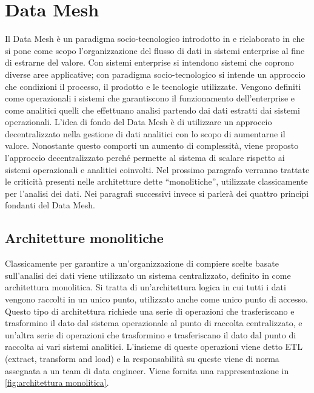 \documentclass[a4paper,12pt]{report}
\begin{document}
\section{Data Mesh}
Il Data Mesh è un paradigma socio-tecnologico introdotto in \cite{dehghani_data_2022} e rielaborato in \cite{zhamak_dehgani_how_2023,zhamak_dehgani_data_2023} che si pone come scopo l'organizzazione del flusso di dati in sistemi enterprise al fine di estrarne del valore.  
Con sistemi enterprise si intendono sistemi che coprono diverse aree applicative; con paradigma socio-tecnologico si intende un approccio che condizioni il processo, il prodotto e le tecnologie utilizzate. 
Vengono definiti come operazionali i sistemi che garantiscono il funzionamento dell'enterprise e come analitici quelli che effettuano analisi partendo dai dati estratti dai sistemi operazionali.
L'idea di fondo del Data Mesh è di utilizzare un approccio decentralizzato nella gestione di dati analitici con lo scopo di aumentarne il valore.
Nonostante questo comporti un aumento di complessità, viene proposto l'approccio decentralizzato perché permette al sistema di scalare rispetto ai sistemi operazionali e analitici coinvolti. 
Nel prossimo paragrafo verranno trattate le criticità presenti nelle architetture dette ``monolitiche'', utilizzate classicamente per l'analisi dei dati. 
Nei paragrafi successivi invece si parlerà dei quattro principi fondanti del Data Mesh.
\subsection{Architetture monolitiche}\label{architetture monolitiche}
Classicamente per garantire a un'organizzazione di compiere scelte basate sull'analisi dei dati viene utilizzato un sistema centralizzato, definito in \cite{zhamak_dehgani_how_2023} come architettura monolitica.
Si tratta di un'architettura logica in cui tutti i dati vengono raccolti in un unico punto, utilizzato anche come unico punto di accesso.
Questo tipo di architettura richiede una serie di operazioni che trasferiscano e trasformino il dato dal sistema operazionale al punto di raccolta centralizzato, e un'altra serie di operazioni che trasformino e trasferiscano il dato dal punto di raccolta ai vari sistemi analitici. 
L'insieme di queste operazioni viene detto ETL (extract, transform and load) e la responsabilità su queste viene di norma assegnata a un team di data engineer. 
Viene fornita una rappresentazione in \ref{fig:architettura monolitica}.
\end{document}
